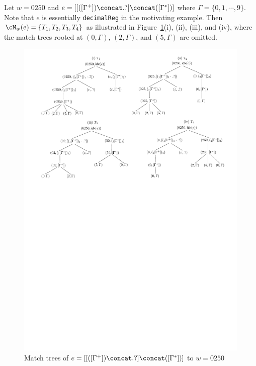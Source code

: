 \begin{example}\label{exmp-regex-match-tree}
Let $w= 0250$ and $e = [[([\Gamma^+])\concat .?] \concat ([\Gamma^*])]$ where $\Gamma = \{0,1,\cdots,9\}$. Note that $e$ is essentially {\tt decimalReg} in the motivating example. Then $\cM_{w}(e) = \{T_1,T_2,T_3, T_4\}$ as illustrated in Figure~\ref{fig-regex-semantics-decimal}(i), (ii), (iii), and (iv), where the match trees rooted at $(0, \Gamma)$, $(2, \Gamma)$, and $(5, \Gamma)$ are omitted. %
\begin{figure}[htb]
\centering
\includegraphics[width=1\textwidth]{regex-semantics-decimal.pdf}
\caption{Match trees of $e=[[([\Gamma^+])\concat .?] \concat ([\Gamma^*])]$ to $w= 0250$}
\label{fig-regex-semantics-decimal}

\end{figure}
 \end{example}



